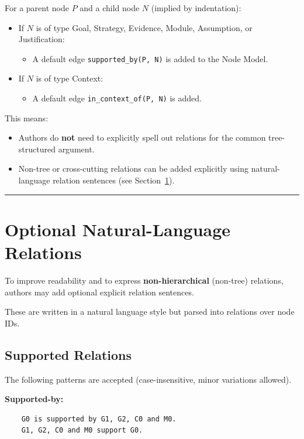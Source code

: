 \documentclass[11pt,twoside,a4paper]{article}
\begin{document}
For a parent node \(P\) and a child node \(N\) (implied by indentation):
\begin{itemize}[leftmargin=2em]
  \item If \(N\) is of type Goal, Strategy, Evidence, Module, Assumption, or Justification:
  \begin{itemize}[leftmargin=1.5em]
    \item A default edge \texttt{supported\_by(P, N)} is added to the Node Model.
  \end{itemize}

  \item If \(N\) is of type Context:
  \begin{itemize}[leftmargin=1.5em]
    \item A default edge \texttt{in\_context\_of(P, N)} is added.
  \end{itemize}
\end{itemize}

This means:
\begin{itemize}[leftmargin=2em]
  \item Authors do \textbf{not} need to explicitly spell out relations for the common tree-structured argument.
  \item Non-tree or cross-cutting relations can be added explicitly using natural-language relation sentences (see Section~\ref{sec:nl-relations}).
\end{itemize}

\bigskip
\hrule
\bigskip

\section{Optional Natural-Language Relations}
\label{sec:nl-relations}

To improve readability and to express \textbf{non-hierarchical} (non-tree) relations, authors may add optional explicit relation sentences.

These are written in a natural language style but parsed into relations over node IDs.

\subsection{Supported Relations}

The following patterns are accepted (case-insensitive, minor variations allowed).

\textbf{Supported-by:}
\begin{verbatim}
    G0 is supported by G1, G2, C0 and M0.
    G1, G2, C0 and M0 support G0.
\end{verbatim}
\end{document}
